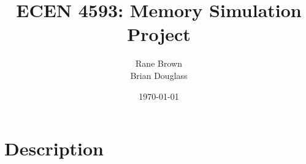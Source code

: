 \documentclass[11pt,titlepage]{article}
\author{Rane Brown \\ Brian Douglass}
\title{ECEN 4593: Memory Simulation Project}
\date{\today}
\begin{document}
\maketitle
\tableofcontents
\listoffigures
\newpage

\section{Description}
\end{document}

